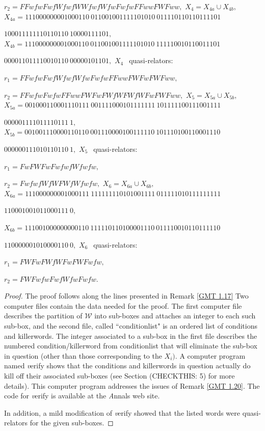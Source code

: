 \begin{proposition}
$r_2 = FFwfwFwfWfwfWWfwfWfwFwfwFFwwFWFww,$
\noindent $X_4 = X_{4a} \cup X_{4b},$
\noindent $X_{4a} = 
111000000001000110\ 
011001001111101010\ 
011110110110111101$\hfill

\hfill  
$100011111110110110\ 
10000111101,$
\noindent $X_{4b} = 
111000000001000110\ 
011001001111101010\ 
111110010110011101$\hfill

\hfill  
$000011011110010110\ 
00000101101,$
\noindent $X_4\ \ $ quasi\/{\textrm -}\/relators\/{\textrm :}

$r_1 = FFwfwFwfWfwfWfwFwfwFFwwFWFwFWFww,$

$r_2 = FFwfwFwfwFFwwFWFwFWfWFWfWFwFWFww,$
\noindent $X_5 = X_{5a} \cup X_{5b},$
\noindent $X_{5a} = 
001000110001110111\ 
001111000101111111\ 
101111100111001111$\hfill

\hfill 
$000001111011110111\ 1,$
\noindent  $X_{5b} = 
001001110000110110\ 
001110000100111110\ 
101110100110001110$\hfill

\hfill  
$000000111010110110\ 1,$
\vglue4pt
\noindent $X_5\ \ $ quasi\/{\textrm -}\/relators\/{\textrm :}

$r_1 = FwFWFwFwfwfWfwfw,$

$r_2 = FwfwfWfWFWfWfwfw,$
\vfil
\noindent $X_6 = X_{6a} \cup X_{6b},$
\vfil
\noindent $X_{6a} = 
111000000001000111\ 
111111110101001111\ 
011111010111111111$\hfill

\hfill  
$110001001011000111\ 0,$

\noindent $X_{6b} = 
111001000000000110\ 
111110110100001110\ 
011110010110111110$\hfill

\hfill  
$110000001010000110\ 0,$
\vglue4pt
\noindent $X_6\ \ $ quasi\/{\textrm -}\/relators\/{\textrm :}\/

$r_1 = FWFwFWfWFwFWFwfw,$

$r_2 = FWFwfwFwfWfwFwfw.$
\end{proposition}

 
\begin{proof}{}  
The proof follows along the lines presented in
Remark \ref{GMT 1.17}
Two computer files contain the data needed for the proof.   
The first computer file describes the partition of ${\mathcal W}$ into
sub-boxes and attaches an integer to each such sub-box, 
and the second file, called ``conditionlist" is an ordered list of conditions and killerwords.
The integer associated to a sub-box in the first file describes the numbered condition/killerword from   conditionlist that will eliminate the sub-box
in question (other than those corresponding to the $X_i).$ A computer program named {\textit verify} shows
that the conditions and killerwords in question actually do kill off their associated sub-boxes (see
	Section (CHECKTHIS: 5)  %
	for more details).  This computer
program addresses the issues of Remark \ref{GMT 1.20}.  The code for {\textit
verify} is available at the {\textit Annals} web site. 

In addition, a mild modification of {\textit verify} showed that the listed words were quasi-relators for the given sub-boxes. 
\end{proof}

